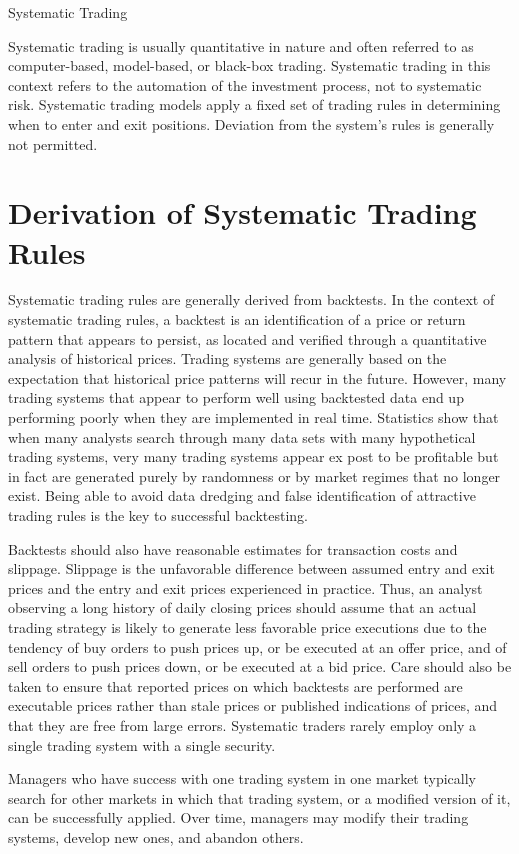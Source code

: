 \documentclass[11pt]{article}
\begin{document}
Systematic Trading

Systematic trading is usually quantitative in nature and often referred to as computer-based, model-based, or black-box trading. Systematic trading in this context refers to the automation of the investment process, not to systematic risk. Systematic trading models apply a fixed set of trading rules in determining when to enter and exit positions. Deviation from the system's rules is generally not permitted.

\section*{Derivation of Systematic Trading Rules}
Systematic trading rules are generally derived from backtests. In the context of systematic trading rules, a backtest is an identification of a price or return pattern that appears to persist, as located and verified through a quantitative analysis of historical prices. Trading systems are generally based on the expectation that historical price patterns will recur in the future. However, many trading systems that appear to perform well using backtested data end up performing poorly when they are implemented in real time. Statistics show that when many analysts search through many data sets with many hypothetical trading systems, very many trading systems appear ex post to be profitable but in fact are generated purely by randomness or by market regimes that no longer exist. Being able to avoid data dredging and false identification of attractive trading rules is the key to successful backtesting.

Backtests should also have reasonable estimates for transaction costs and slippage. Slippage is the unfavorable difference between assumed entry and exit prices and the entry and exit prices experienced in practice. Thus, an analyst observing a long history of daily closing prices should assume that an actual trading strategy is likely to generate less favorable price executions due to the tendency of buy orders to push prices up, or be executed at an offer price, and of sell orders to push prices down, or be executed at a bid price. Care should also be taken to ensure that reported prices on which backtests are performed are executable prices rather than stale prices or published indications of prices, and that they are free from large errors. Systematic traders rarely employ only a single trading system with a single security.

Managers who have success with one trading system in one market typically search for other markets in which that trading system, or a modified version of it, can be successfully applied. Over time, managers may modify their trading systems, develop new ones, and abandon others.
\end{document}
